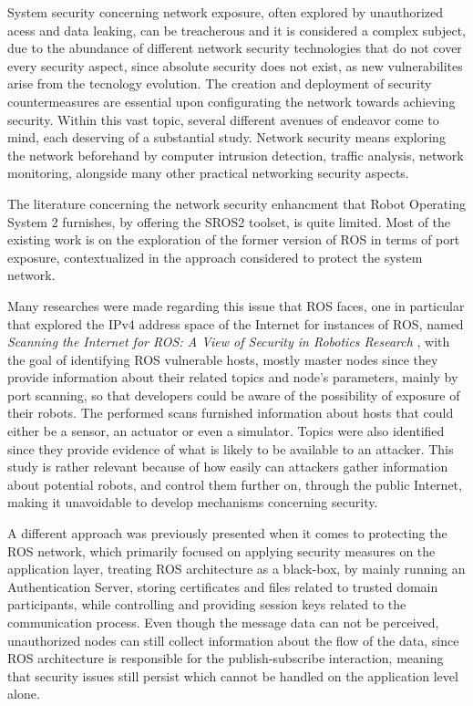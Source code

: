 System security concerning network exposure, often explored by unauthorized acess and data leaking, can be treacherous and it is considered a complex subject, due to the abundance of different network security technologies that do not cover every security aspect, since absolute security does not exist, as new vulnerabilites arise from the tecnology evolution.\cite{kaeo2004designing} The creation and deployment of security countermeasures are essential upon configurating the network towards achieving security. Within this vast topic, several different avenues of endeavor come to mind, each deserving of a substantial study. Network security means exploring the network beforehand by computer intrusion detection, traffic analysis, network monitoring, alongside many other practical networking security aspects. \cite{marin2005network}

The literature concerning the network security enhancment that Robot Operating System 2 furnishes, by offering the SROS2 toolset, is quite limited. Most of the existing work is on the exploration of the former version of ROS in terms of port exposure, contextualized in the approach considered to protect the system network.  

Many researches were made regarding this issue that ROS faces, one in particular that explored the IPv4 address space of the Internet for instances of ROS, named \textit{Scanning the Internet for ROS: A View of Security in Robotics Research} \cite{8794451}, with the goal of identifying ROS vulnerable hosts, mostly master nodes since they provide information about their related topics and node's parameters, mainly by port scanning, so that developers could be aware of the possibility of exposure of their robots. The performed scans furnished information about hosts that could either be a sensor, an actuator or even a simulator. Topics were also identified since they provide evidence of what is likely to be available to an attacker. This study is rather relevant because of how easily can attackers gather information about potential robots, and control them further on, through the public Internet, making it unavoidable to develop mechanisms concerning security.

A different approach was previously presented \cite{application-security-ros} when it comes to protecting the ROS network, which primarily focused on applying security measures on the application layer, treating ROS architecture as a black-box, by mainly running an Authentication Server, storing certificates and files related to trusted domain participants, while controlling and providing session keys related to the communication process. Even though the message data can not be perceived, unauthorized nodes can still collect information about the flow of the data, since ROS architecture is responsible for the publish-subscribe interaction, meaning that security issues still persist which cannot be handled on the application level alone.  

